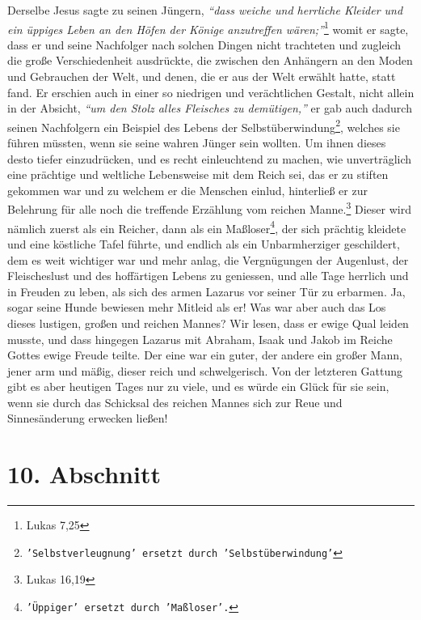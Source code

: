 Derselbe Jesus sagte
zu seinen Jüngern,
\textit{"`dass weiche und herrliche Kleider und ein üppiges Leben an
den Höfen der Könige anzutreffen wären;"'}\footnote{Lukas 7,25}
womit er sagte,
dass er und seine Nachfolger nach solchen Dingen nicht trachteten und zugleich
die große Verschiedenheit ausdrückte, die zwischen den Anhängern an den Moden
und Gebrauchen der Welt, und denen, die er aus der Welt erwählt hatte, statt
fand. Er erschien auch in einer so niedrigen und verächtlichen Gestalt, nicht
allein in der Absicht,
\textit{"`um den Stolz alles Fleisches zu demütigen,"'} er gab
auch dadurch seinen Nachfolgern ein Beispiel des Lebens der
Selbstüberwindung\footnote{\texttt{'Selbstverleugnung' ersetzt durch
'Selbstüberwindung'}},
welches sie führen müssten, wenn sie seine wahren Jünger sein wollten. Um ihnen
dieses desto tiefer einzudrücken, und es recht einleuchtend zu machen, wie
unverträglich eine prächtige und weltliche Lebensweise mit dem Reich sei, das
er zu stiften gekommen war und zu welchem er die Menschen einlud, hinterließ
er zur Belehrung für alle noch die treffende Erzählung vom reichen
Manne.\footnote{Lukas 16,19}
Dieser wird nämlich zuerst als ein Reicher, dann als
ein Maßloser\footnote{\texttt{'Üppiger' ersetzt durch 'Maßloser'.}}, der sich
prächtig
kleidete und eine köstliche Tafel führte, und
endlich als ein Unbarmherziger geschildert, dem es weit wichtiger war und mehr
anlag, die Vergnügungen der Augenlust, der Fleischeslust und des hoffärtigen
Lebens zu geniessen, und alle Tage herrlich und in Freuden zu leben, als sich
des
armen Lazarus vor seiner Tür zu erbarmen. Ja, sogar
seine Hunde
bewiesen mehr
Mitleid als er! Was war aber auch das Los dieses lustigen, großen
und reichen
Mannes? Wir lesen, dass er ewige Qual leiden musste, und dass
hingegen Lazarus mit
Abraham, Isaak und
Jakob
im Reiche Gottes ewige Freude teilte. Der eine war ein
guter, der andere ein großer Mann, jener arm und mäßig, dieser reich und
schwelgerisch. Von der letzteren Gattung gibt es aber heutigen Tages nur zu
viele, und es würde ein Glück für sie sein, wenn sie durch das Schicksal des
reichen Mannes sich zur Reue und Sinnesänderung erwecken ließen!

\section{10. Abschnitt} \label{kap14_ab10}

